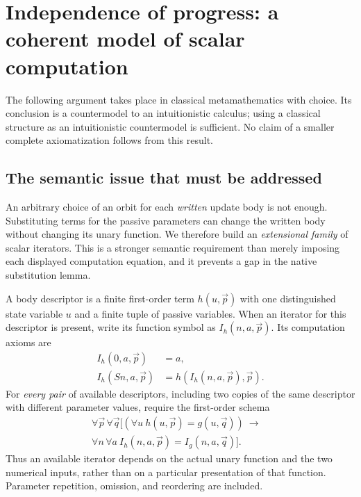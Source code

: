 \section{Independence of progress: a coherent model of scalar computation}
\label{sec:progress-independence-audit}

The following argument takes place in classical metamathematics with choice.
Its conclusion is a countermodel to an intuitionistic calculus; using a
classical structure as an intuitionistic countermodel is sufficient.
No claim of a smaller complete axiomatization follows from this result.

\subsection{The semantic issue that must be addressed}

An arbitrary choice of an orbit for each \emph{written} update body is not
enough. Substituting terms for the passive parameters can change the written
body without changing its unary function. We therefore build an
\emph{extensional family} of scalar iterators. This is a stronger semantic
requirement than merely imposing each displayed computation equation, and
it prevents a gap in the native substitution lemma.

A body descriptor is a finite first-order term $h(u,\vec p)$ with one
distinguished state variable $u$ and a finite tuple of passive variables.
When an iterator for this descriptor is present, write its function symbol
as $I_h(n,a,\vec p)$. Its computation axioms are
\begin{align}
 I_h(0,a,\vec p)&=a,\label{eq:audit-c0}\\
 I_h(Sn,a,\vec p)&=h(I_h(n,a,\vec p),\vec p).
 \label{eq:audit-cs}
\end{align}
For \emph{every pair} of available descriptors, including two copies of the
same descriptor with different parameter values, require the first-order
schema
\begin{equation}
\begin{split}
 \forall\vec p\,\forall\vec q\bigl[
  (\forall u\ h(u,\vec p)=g(u,\vec q))\ \longrightarrow {}&\\[-0.6em]
  \forall n\,\forall a\ I_h(n,a,\vec p)=I_g(n,a,\vec q)
 \bigr].&
\end{split}
\tag{Ext}\label{eq:audit-ext}
\end{equation}
Thus an available iterator depends on the actual unary function and the
two numerical inputs, rather than on a particular presentation of that
function. Parameter repetition, omission, and reordering are included.

